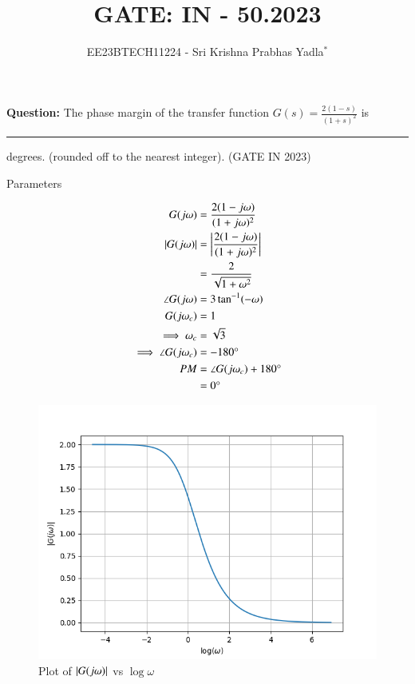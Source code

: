\documentclass[journal,12pt,twocolumn]{IEEEtran}
\theoremstyle{remark}
\begin{document}

\vspace{3cm}

\title{GATE: IN - 50.2023}
\author{EE23BTECH11224 - Sri Krishna Prabhas Yadla$^{*}$%
}
\maketitle
\newpage
\bigskip

\renewcommand{\thefigure}{\arabic{figure}}
\renewcommand{\thetable}{\arabic{table}}


\vspace{3cm}
\textbf{Question:} The phase margin of the transfer function $G(s) = \frac{2(1-s)}{(1+s)^2}$ is \rule{1cm}{0.15mm} degrees. (rounded off to the nearest integer). \hfill (GATE IN 2023)\\
\solution
\begin{table}[htbp]
	\centering
	\def\arraystrech{1.5}
	
	\caption{Parameters}
	\label{tab:parameters}
\end{table}
\begin{align}
	G(j\omega) &= \frac{2(1-j\omega)}{(1+j\omega)^2} \\
	\left\vert G(j\omega)\right\vert &= \left\vert\frac{2(1-j\omega)}{(1+j\omega)^2}\right\vert \\
	&= \frac{2}{\sqrt{1+\omega^2}} \\
	\angle G(j\omega) &= 3\tan^{-1}(-\omega) \\
	G(j\omega_c) &= 1 \\ 
	\implies \omega_c &= \sqrt{3} \\
	\implies \angle G(j\omega_c)&= -180\degree \\
	PM &= \angle G(j\omega_c) + 180\degree \\
	&= 0\degree
\end{align}
\begin{figure}[htbp]
	\includegraphics[width=\columnwidth]{figs/magnitude.png}
	\caption{Plot of $\left\vert G(j\omega)\right\vert$ vs $\log{\omega}$}
	\label{fig:mag/w}
\end{figure}
\end{document}
